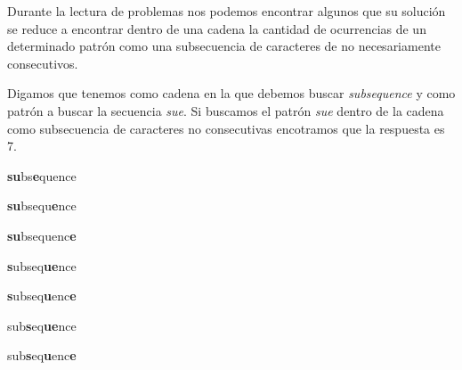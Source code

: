 Durante la lectura de problemas nos podemos encontrar algunos que su solución se reduce a encontrar dentro de una cadena la cantidad de ocurrencias de un determinado patrón como una subsecuencia de caracteres de no necesariamente consecutivos.

Digamos que tenemos como cadena en la que debemos buscar {\em subsequence} y como patrón a buscar la secuencia {\em sue}. Si buscamos el patrón {\em sue} dentro de la cadena como subsecuencia de caracteres no consecutivas encotramos que la respuesta es 7.

\textbf{su}bs\textbf{e}quence

\textbf{su}bsequ\textbf{e}nce

\textbf{su}bsequenc\textbf{e}

\textbf{s}ubseq\textbf{ue}nce

\textbf{s}ubseq\textbf{u}enc\textbf{e}

sub\textbf{s}eq\textbf{ue}nce

sub\textbf{s}eq\textbf{u}enc\textbf{e}